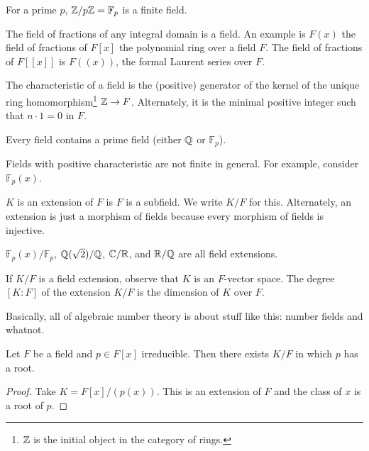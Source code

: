 \documentclass[10pt, twoside]{article}
\newcommand{\F}{\mathbb{F}}
\begin{document}
    \begin{exm}
         For a prime $p$, $\Z/p\Z = \F_p$ is a finite field.
    \end{exm}

    \begin{exm}
        The field of fractions of any integral domain is a field. An example is $F(x)$ the field of fractions of $F[x]$ the polynomial ring over a field $F$. The field of fractions of $F[[x]]$ is $F((x))$, the formal Laurent series over $F$.
    \end{exm}

    \begin{defn}[Characteristic]
        The characteristic of a field is the (positive) generator of the kernel of the unique ring homomorphism\footnote{$\mathbb{Z}$ is the initial object in the category of rings.} $\mathbb{Z} \rightarrow F$. Alternately, it is the minimal positive integer such that $n\cdot 1 = 0$ in $F$.
    \end{defn}

    \begin{rmk}
        Every field contains a prime field (either $\mathbb{Q}$ or $\F_p$).
    \end{rmk}

    \begin{rmk}
        Fields with positive characteristic are not finite in general. For example, consider $\F_p(x)$.
    \end{rmk}

    \begin{defn}
        $K$ is an extension of $F$ is $F$ is a subfield. We write $K/F$ for this. Alternately, an extension is just a morphism of fields because every morphism of fields is injective.
    \end{defn}

    \begin{exm}
        $\F_p(x)/\F_p$, $\mathbb{Q}(\sqrt{2})/\mathbb{Q}$, $\mathbb{C}/\mathbb{R}$, and $\mathbb{R}/\mathbb{Q}$ are all field extensions.
    \end{exm}

    \begin{defn}
        If $K/F$ is a field extension, observe that $K$ is an $F$-vector space. The degree $[K:F]$ of the extension $K/F$ is the dimension of $K$ over $F$. 
    \end{defn}

    Basically, all of algebraic number theory is about stuff like this: number fields and whatnot.

    \begin{thm}
        Let $F$ be a field and $p \in F[x]$ irreducible. Then there exists $K/F$ in which $p$ has a root.

        \begin{proof}
            Take $K = F[x]/(p(x))$. This is an extension of $F$ and the class of $x$ is a root of $p$.
        \end{proof}
    \end{thm}
\end{document}

